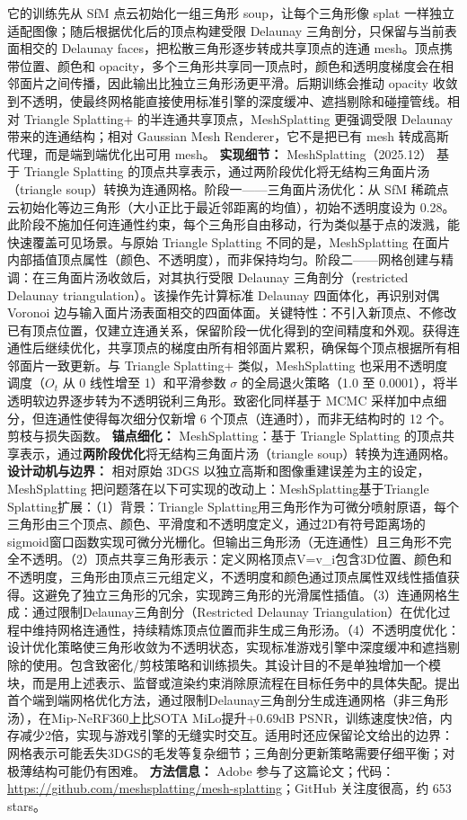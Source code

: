 它的训练先从 SfM 点云初始化一组三角形 soup，让每个三角形像 splat 一样独立适配图像；随后根据优化后的顶点构建受限 Delaunay 三角剖分，只保留与当前表面相交的 Delaunay faces，把松散三角形逐步转成共享顶点的连通 mesh。顶点携带位置、颜色和 opacity，多个三角形共享同一顶点时，颜色和透明度梯度会在相邻面片之间传播，因此输出比独立三角形汤更平滑。后期训练会推动 opacity 收敛到不透明，使最终网格能直接使用标准引擎的深度缓冲、遮挡剔除和碰撞管线。相对 Triangle Splatting+ 的半连通共享顶点，MeshSplatting 更强调受限 Delaunay 带来的连通结构；相对 Gaussian Mesh Renderer，它不是把已有 mesh 转成高斯代理，而是端到端优化出可用 mesh。
\textbf{实现细节：} MeshSplatting（2025.12） 基于 Triangle Splatting 的顶点共享表示，通过两阶段优化将无结构三角面片汤（triangle soup）转换为连通网格。阶段一——三角面片汤优化：从 SfM 稀疏点云初始化等边三角形（大小正比于最近邻距离的均值），初始不透明度设为 0.28。此阶段不施加任何连通性约束，每个三角形自由移动，行为类似基于点的泼溅，能快速覆盖可见场景。与原始 Triangle Splatting 不同的是，MeshSplatting 在面片内部插值顶点属性（颜色、不透明度），而非保持均匀。阶段二——网格创建与精调：在三角面片汤收敛后，对其执行受限 Delaunay 三角剖分（restricted Delaunay triangulation）。该操作先计算标准 Delaunay 四面体化，再识别对偶 Voronoi 边与输入面片汤表面相交的四面体面。关键特性：不引入新顶点、不修改已有顶点位置，仅建立连通关系，保留阶段一优化得到的空间精度和外观。获得连通性后继续优化，共享顶点的梯度由所有相邻面片累积，确保每个顶点根据所有相邻面片一致更新。与 Triangle Splatting+ 类似，MeshSplatting 也采用不透明度调度（$O_t$ 从 0 线性增至 1）和平滑参数 $\sigma$ 的全局退火策略（1.0 至 0.0001），将半透明软边界逐步转为不透明锐利三角形。致密化同样基于 MCMC 采样加中点细分，但连通性使得每次细分仅新增 6 个顶点（连通时），而非无结构时的 12 个。剪枝与损失函数。
\textbf{锚点细化：} MeshSplatting：基于 Triangle Splatting 的顶点共享表示，通过\textbf{两阶段优化}将无结构三角面片汤（triangle soup）转换为连通网格。
\textbf{设计动机与边界：} 相对原始 3DGS 以独立高斯和图像重建误差为主的设定，MeshSplatting 把问题落在以下可实现的改动上：MeshSplatting基于Triangle Splatting扩展：（1）背景：Triangle Splatting用三角形作为可微分喷射原语，每个三角形由三个顶点、颜色、平滑度和不透明度定义，通过2D有符号距离场的sigmoid窗口函数实现可微分光栅化。但输出三角形汤（无连通性）且三角形不完全不透明。（2）顶点共享三角形表示：定义网格顶点V={v\_i}包含3D位置、颜色和不透明度，三角形由顶点三元组定义，不透明度和颜色通过顶点属性双线性插值获得。这避免了独立三角形的冗余，实现跨三角形的光滑属性插值。（3）连通网格生成：通过限制Delaunay三角剖分（Restricted Delaunay Triangulation）在优化过程中维持网格连通性，持续精炼顶点位置而非生成三角形汤。（4）不透明度优化：设计优化策略使三角形收敛为不透明状态，实现标准游戏引擎中深度缓冲和遮挡剔除的使用。包含致密化/剪枝策略和训练损失。其设计目的不是单独增加一个模块，而是用上述表示、监督或渲染约束消除原流程在目标任务中的具体失配。提出首个端到端网格优化方法，通过限制Delaunay三角剖分生成连通网格（非三角形汤），在Mip-NeRF360上比SOTA MiLo提升+0.69dB PSNR，训练速度快2倍，内存减少2倍，实现与游戏引擎的无缝实时交互。适用时还应保留论文给出的边界：网格表示可能丢失3DGS的毛发等复杂细节；三角剖分更新策略需要仔细平衡；对极薄结构可能仍有困难。
\textbf{方法信息：} Adobe 参与了这篇论文；代码：\url{https://github.com/meshsplatting/mesh-splatting}；GitHub 关注度很高，约 653 stars。



